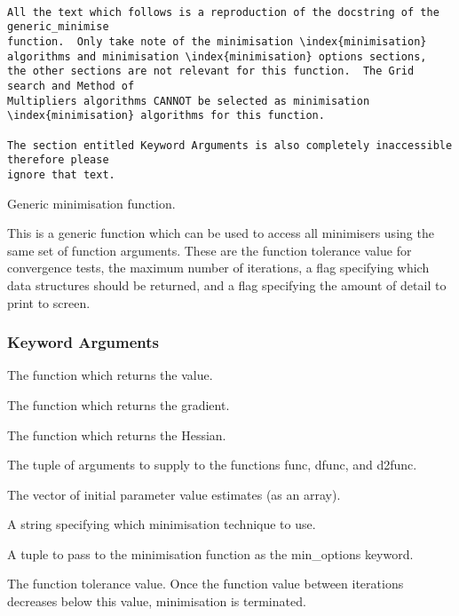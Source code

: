 {\footnotesize \begin{verbatim}

All the text which follows is a reproduction of the docstring of the generic_minimise
function.  Only take note of the minimisation \index{minimisation} algorithms and minimisation \index{minimisation} options sections,
the other sections are not relevant for this function.  The Grid search and Method of
Multipliers algorithms CANNOT be selected as minimisation \index{minimisation} algorithms for this function.

The section entitled Keyword Arguments is also completely inaccessible therefore please
ignore that text.

\end{verbatim}}


Generic minimisation  function.

This is a generic function which can be used to access all minimisers  using the same set of
function arguments.  These are the function tolerance value for convergence tests, the maximum
number of iterations, a flag specifying which data structures should be returned, and a flag
specifying the amount of detail to print to screen.


\subsubsection{Keyword Arguments}


  The function which returns the value.

  The function which returns the gradient.

  The function which returns the Hessian.

  The tuple of arguments to supply to the functions func, dfunc, and d2func.

  The vector of initial parameter value estimates (as an array).

  A string specifying which minimisation  technique to use.

  A tuple to pass to the minimisation  function as the min\_options keyword.

  The function tolerance value.  Once the function value between iterations decreases below this value, minimisation  is terminated.

